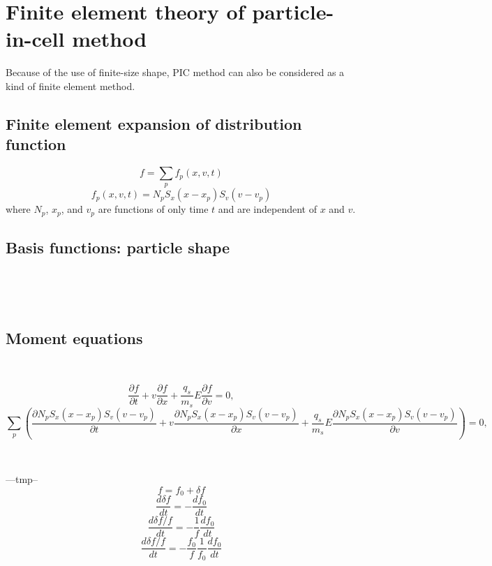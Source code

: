 \documentclass{article}
\begin{document}
\section{Finite element theory of particle-in-cell method}

Because of the use of finite-size shape, PIC method can also be considered as
a kind of finite element method{\cite{lapenta_pic}}.

\subsection{Finite element expansion of distribution function}

\begin{equation}
  f = \sum_p f_p (x, v, t)
\end{equation}
\begin{equation}
  f_p (x, v, t) = N_p S_x (x - x_p) S_v (v - v_p)
\end{equation}
where $N_p$, $x_p$, and $v_p$ are functions of only time $t$ and are
independent of $x$ and $v$.

\subsection{Basis functions: particle shape }

\

\

\subsection{Moment equations}

\


\begin{equation}
  \frac{\partial f}{\partial t} + v \frac{\partial f}{\partial x} +
  \frac{q_s}{m_s} E \frac{\partial f}{\partial v} = 0,
\end{equation}
\begin{equation}
  \sum_p \left( \frac{\partial N_p S_x (x - x_p) S_v (v - v_p)}{\partial t} +
  v \frac{\partial N_p S_x (x - x_p) S_v (v - v_p)}{\partial x} +
  \frac{q_s}{m_s} E \frac{\partial N_p S_x (x - x_p) S_v (v - v_p)}{\partial
  v} \right) = 0,
\end{equation}


\

---tmp--
\begin{equation}
  f = f_0 + \delta f
\end{equation}
\begin{equation}
  \frac{d \delta f}{d t} = - \frac{d f_0}{d t}
\end{equation}
\begin{equation}
  \frac{d \delta f / f}{d t} = - \frac{1}{f}  \frac{d f_0}{d t}
\end{equation}
\begin{equation}
  \frac{d \delta f / f}{d t} = - \frac{f_0}{f}  \frac{1}{f_0}  \frac{d f_0}{d
  t}
\end{equation}
\end{document}
